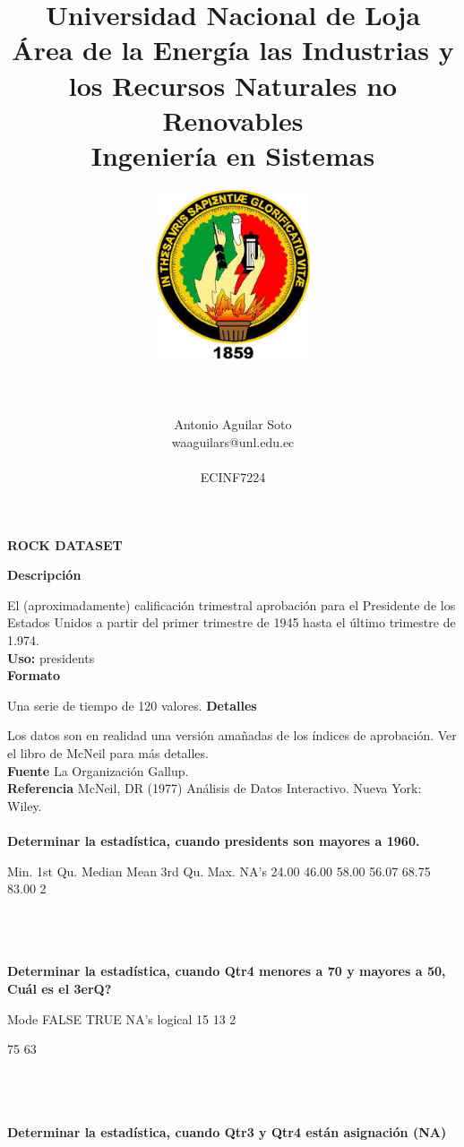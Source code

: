 \documentclass[11pt]{report}
\title{\Huge Universidad Nacional de Loja \\ 
Área de la Energía las Industrias y los Recursos Naturales no Renovables \\
Ingeniería en Sistemas \\}
\author{\includegraphics[width=5cm, height=5cm]{unl.jpg} \\\\\\\\
Antonio Aguilar Soto \\ waaguilars@unl.edu.ec \\\\
ECINF7224}\\\\
\begin{document}

\maketitle

\begin{center}\textbf{ROCK DATASET}\end{center}
\textbf{Descripción}

El (aproximadamente) calificación trimestral aprobación para el Presidente de los Estados Unidos a partir del primer trimestre de 1945 hasta el último trimestre de 1.974.\\
\textbf{Uso:}
presidents
\\
\textbf{Formato}

Una serie de tiempo de 120 valores.
\textbf{Detalles}

Los datos son en realidad una versión amañadas de los índices de aprobación. Ver el libro de McNeil para más detalles.
\\
\textbf{Fuente}
La Organización Gallup.
\\
\textbf{Referencia}
McNeil, DR (1977) Análisis de Datos Interactivo. Nueva York: Wiley.
\\\\
\textbf{Determinar la estadística, cuando presidents son mayores a 1960.}

\begin{Schunk}
\begin{Soutput}
   Min. 1st Qu.  Median    Mean 3rd Qu.    Max.    NA's 
  24.00   46.00   58.00   56.07   68.75   83.00       2 
\end{Soutput}
\end{Schunk}
\\\\\\
\textbf{Determinar la estadística, cuando Qtr4 menores a 70 y mayores a 50, Cuál es el 3erQ?}

\begin{Schunk}
\begin{Soutput}
   Mode   FALSE    TRUE    NA's 
logical      15      13       2 
\end{Soutput}
\begin{Soutput}
75%
 63 
\end{Soutput}
\end{Schunk}
\\\\\\
\textbf{ Determinar la estadística, cuando Qtr3 y Qtr4 están asignación (NA)}
\end{document}

